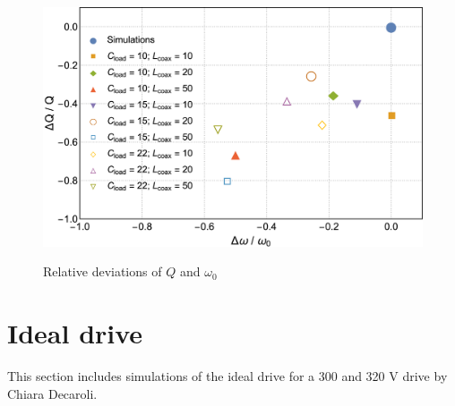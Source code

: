 \begin{figure}[h]
	\centering
	\includegraphics[width=\textwidth]{images/Q_w_plot}
	\label{fig:Q_w_deviation}
	\caption{Relative deviations of $Q$ and $\omega_0$}
\end{figure}

\section{Ideal drive}
This section includes simulations of the ideal drive for a 300 and 320 V drive by Chiara Decaroli.

